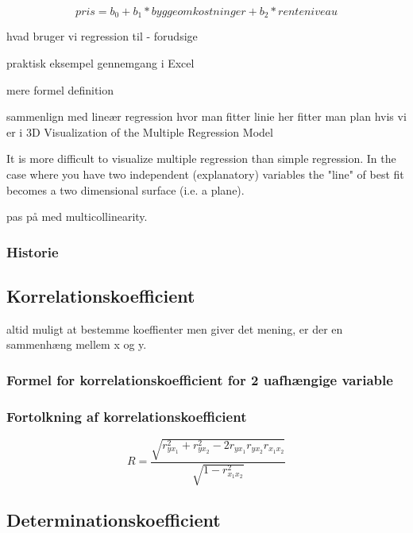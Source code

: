 \begin{displaymath}
  pris = b_0 + b_1 * byggeomkostninger + b_2 * renteniveau
\end{displaymath}


hvad bruger vi regression til - forudsige







praktisk eksempel gennemgang i Excel

mere formel definition

sammenlign med lineær regression
hvor man fitter linie
her fitter man plan hvis vi er i 3D
Visualization of the Multiple Regression Model

It is more difficult to visualize multiple regression than simple regression.  In the case where you have two independent (explanatory) variables the "line" of best fit becomes a two dimensional surface (i.e. a plane).



pas på med multicollinearity.

\subsubsection{Historie}


\subsection{Korrelationskoefficient}
altid muligt at bestemme koeffienter men giver det mening,
er der en sammenhæng mellem x og y.

\subsubsection{Formel for korrelationskoefficient for 2 uafhængige variable}

\subsubsection{Fortolkning af korrelationskoefficient}

\begin{displaymath}
  R = \frac{\sqrt{r^2_{yx_1} + r^2_{yx_2} - 2r_{yx_1} r_{yx_2} r_{{x_1}x_2}}}{\sqrt{1 - r^2_{{x_1}x_2}}}
\end{displaymath}

\subsection{Determinationskoefficient}


